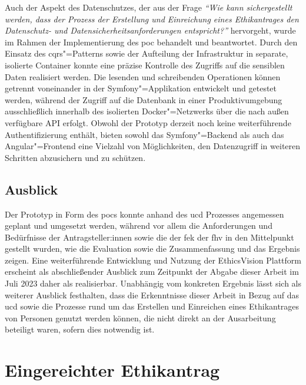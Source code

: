 \documentclass[a4paper,12pt,twoside]{scrreprt}
\begin{document}
\medskip

Auch der Aspekt des Datenschutzes, der aus der Frage \textit{\enquote{Wie kann sichergestellt werden, dass der Prozess der Erstellung und Einreichung eines Ethikantrages den Datenschutz- und Datensicherheitsanforderungen entspricht?}} hervorgeht, wurde im Rahmen der Implementierung des \acl{poc} behandelt und beantwortet. Durch den Einsatz des \ac{cqrs}"=Patterns sowie der Aufteilung der Infrastruktur in separate, isolierte Container konnte eine präzise Kontrolle des Zugriffs auf die sensiblen Daten realisiert werden. Die lesenden und schreibenden Operationen können getrennt voneinander in der Symfony"=Applikation entwickelt und getestet werden, während der Zugriff auf die Datenbank in einer Produktivumgebung ausschließlich innerhalb des isolierten Docker"=Netzwerks über die nach außen verfügbare API erfolgt. Obwohl der Prototyp derzeit noch keine weiterführende Authentifizierung enthält, bieten sowohl das Symfony"=Backend als auch das Angular"=Frontend eine Vielzahl von Möglichkeiten, den Datenzugriff in weiteren Schritten abzusichern und zu schützen.

\section{Ausblick}
\label{sec:ausblick}

Der Prototyp in Form des \acl{poc}s konnte anhand des \acl{ucd} Prozesses angemessen geplant und umgesetzt werden, während vor allem die Anforderungen und Bedürfnisse der Antragsteller:innen sowie die der \acl{fek} der \acl{fhv} in den Mittelpunkt gestellt wurden, wie die Evaluation sowie die Zusammenfassung und das Ergebnis zeigen. Eine weiterführende Entwicklung und Nutzung der EthicsVision Plattform erscheint als abschließender Ausblick zum Zeitpunkt der Abgabe dieser Arbeit im Juli 2023 daher als realisierbar. Unabhängig vom konkreten Ergebnis lässt sich als weiterer Ausblick festhalten, dass die Erkenntnisse dieser Arbeit in Bezug auf das \acl{ucd} sowie die Prozesse rund um das Erstellen und Einreichen eines Ethikantrages von Personen genutzt werden können, die nicht direkt an der Ausarbeitung beteiligt waren, sofern dies notwendig ist.

\cleardoublepage
{}
{}
\printbibliography

\appendix

\cleardoublepage
\chapter{Eingereichter Ethikantrag}
\label{appendix:eingereichter-ethikantrag}
\end{document}
